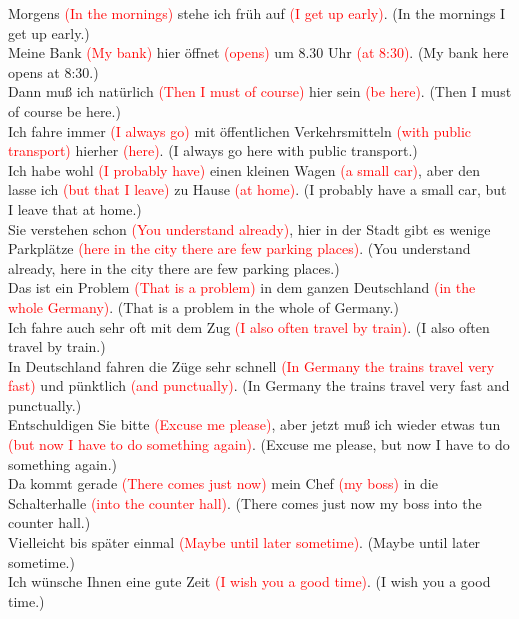 \documentclass{article}
\begin{document}
\begin{enumerate}
    Morgens \textcolor{red}{(In the mornings)} stehe ich früh auf \textcolor{red}{(I get up early)}. (In the mornings I get up early.) \\
    Meine Bank \textcolor{red}{(My bank)} hier öffnet \textcolor{red}{(opens)} um 8.30 Uhr \textcolor{red}{(at 8:30)}. (My bank here opens at 8:30.) \\
    Dann muß ich natürlich \textcolor{red}{(Then I must of course)} hier sein \textcolor{red}{(be here)}. (Then I must of course be here.) \\
    Ich fahre immer \textcolor{red}{(I always go)} mit öffentlichen Verkehrsmitteln \textcolor{red}{(with public transport)} hierher \textcolor{red}{(here)}. (I always go here with public transport.) \\
    Ich habe wohl \textcolor{red}{(I probably have)} einen kleinen Wagen \textcolor{red}{(a small car)}, aber den lasse ich \textcolor{red}{(but that I leave)} zu Hause \textcolor{red}{(at home)}. (I probably have a small car, but I leave that at home.) \\
    Sie verstehen schon \textcolor{red}{(You understand already)}, hier in der Stadt gibt es wenige Parkplätze \textcolor{red}{(here in the city there are few parking places)}. (You understand already, here in the city there are few parking places.) \\
    Das ist ein Problem \textcolor{red}{(That is a problem)} in dem ganzen Deutschland \textcolor{red}{(in the whole Germany)}. (That is a problem in the whole of Germany.) \\
    Ich fahre auch sehr oft mit dem Zug \textcolor{red}{(I also often travel by train)}. (I also often travel by train.) \\
    In Deutschland fahren die Züge sehr schnell \textcolor{red}{(In Germany the trains travel very fast)} und pünktlich \textcolor{red}{(and punctually)}. (In Germany the trains travel very fast and punctually.) \\
    Entschuldigen Sie bitte \textcolor{red}{(Excuse me please)}, aber jetzt muß ich wieder etwas tun \textcolor{red}{(but now I have to do something again)}. (Excuse me please, but now I have to do something again.) \\
    Da kommt gerade \textcolor{red}{(There comes just now)} mein Chef \textcolor{red}{(my boss)} in die Schalterhalle \textcolor{red}{(into the counter hall)}. (There comes just now my boss into the counter hall.) \\
    Vielleicht bis später einmal \textcolor{red}{(Maybe until later sometime)}. (Maybe until later sometime.) \\
    Ich wünsche Ihnen eine gute Zeit \textcolor{red}{(I wish you a good time)}. (I wish you a good time.)


\end{enumerate}
\end{document}
